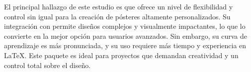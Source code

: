 El principal hallazgo de este estudio es que  ofrece un nivel de flexibilidad y control sin igual para la creación de pósteres altamente personalizados.
Su integración con  permite diseños complejos y visualmente impactantes, lo que lo convierte en la mejor opción para usuarios avanzados. Sin embargo, su curva de aprendizaje es más pronunciada, y su uso requiere más tiempo y experiencia en \LaTeX. Este paquete es ideal para proyectos que demandan creatividad y un control total sobre el diseño.